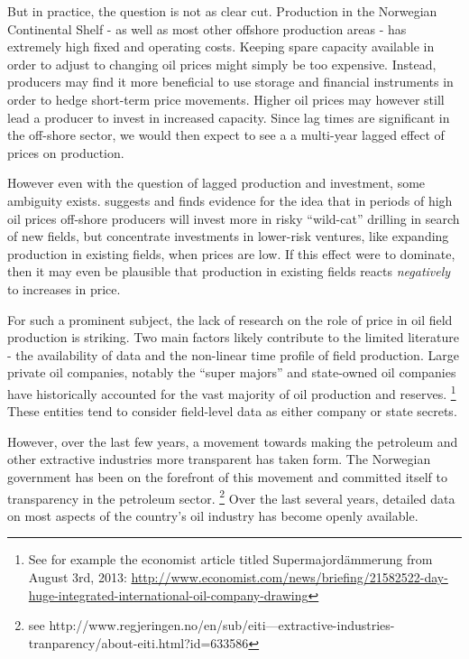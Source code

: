 \documentclass[12pt]{article}
\begin{document}
But in practice, the question is not as clear cut.  Production in the Norwegian Continental Shelf - as well as most other offshore production areas - has extremely high fixed and operating costs.  Keeping spare capacity available in order to adjust to changing oil prices might simply be too expensive.  Instead, producers may find it more beneficial to use storage and financial instruments in order to hedge short-term price movements. Higher oil prices may however still lead a producer to invest in increased capacity.  Since lag times are significant in the off-shore sector, we would then expect to see a a multi-year lagged effect of prices on production.  

However even with the question of lagged production and investment, some ambiguity exists.  \citet{mohn_efforts_2008} suggests and finds evidence for the idea that in periods of high oil prices off-shore producers will invest more in risky ``wild-cat'' drilling in search of new fields, but concentrate investments in lower-risk ventures, like expanding production in existing fields, when prices are low.  If this effect were to dominate, then it may even be plausible that production in existing fields reacts \emph{negatively} to increases in price.  


For such a prominent subject, the lack of research on the role of price in oil field production is striking. Two main factors likely contribute to the limited literature - the availability of data and the non-linear time profile of field production.  Large private oil companies, notably the “super majors” and state-owned oil companies have historically accounted for the vast majority of oil production and reserves. \footnote{See for example the economist article titled Supermajordämmerung from August 3rd, 2013: \url{http://www.economist.com/news/briefing/21582522-day-huge-integrated-international-oil-company-drawing}} These entities tend to consider field-level data as either company or state secrets.   

However, over the last few years, a movement towards making the petroleum and other extractive industries more transparent has taken form.  The Norwegian government has been on the forefront of this movement and committed itself to transparency in the petroleum sector. \footnote{see http://www.regjeringen.no/en/sub/eiti---extractive-industries-tranparency/about-eiti.html?id=633586} Over the last several years, detailed data on most aspects of the country’s oil industry has become openly available.  
\end{document}
